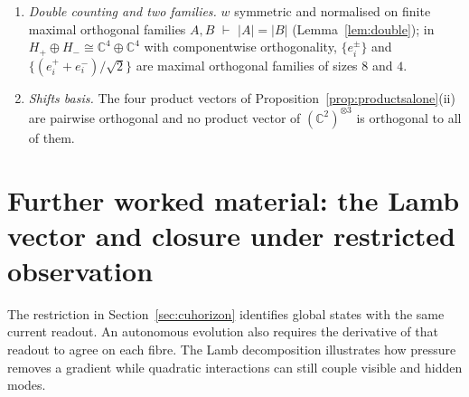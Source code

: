 \documentclass[aps,pra,onecolumn,superscriptaddress,nofootinbib,10pt]{revtex4-2}
\theoremstyle{definition}
\theoremstyle{remark}
\newcommand{\C}{\mathbb{C}}
\begin{document}
\begin{enumerate}[label=(F\arabic*),leftmargin=2.6em]
$\tau(\mathcal P(p,q),\mathcal P(p',q'))=\tau(p,p')\tau(q,q')$ $\vdash$ $\exists$ unitary $U$ onto a four-dimensional
subspace and types $\sigma,\sigma'$ with $\mathcal P([\psi],[\phi])=[U(\psi^\sigma\otimes\phi^{\sigma'})]$.  This one depends on the non-bijective
Wigner theorem \cite{Geher}.
\item \emph{Double counting and two families.}  $w$ symmetric and normalised on finite maximal orthogonal
families $A,B$ $\vdash$ $\lvert A\rvert=\lvert B\rvert$ (Lemma~\ref{lem:double}); in $H_+\oplus H_-\cong\C^4\oplus\C^4$ with componentwise
orthogonality, $\{e^\pm_i\}$ and $\{(e^+_i+e^-_i)/\sqrt2\}$ are maximal orthogonal families of sizes $8$ and $4$.
\item \emph{Shifts basis.}  The four product vectors of Proposition~\ref{prop:productsalone}(ii) are pairwise
orthogonal and no product vector of $(\C^2)^{\otimes3}$ is orthogonal to all of them.
\end{enumerate}


\section{Further worked material: the Lamb vector and closure under restricted observation}\label{app:fluid}
\label{ob:fluid}

The restriction in Section~\ref{sec:cuhorizon} identifies global states with
the same current readout. An autonomous evolution also requires the derivative
of that readout to agree on each fibre. The Lamb decomposition illustrates
how pressure removes a gradient while quadratic interactions can still
couple visible and hidden modes.
\end{document}
